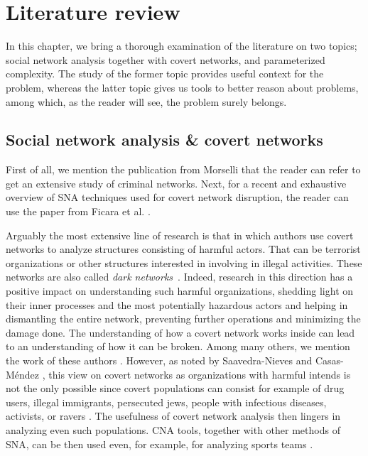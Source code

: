 \chapter{Literature review}

In this chapter, we bring a thorough examination of the literature on two topics;
social network analysis together with covert networks, and parameterized complexity.
The study of the former topic provides useful context for the \HL problem, whereas
the latter topic gives us tools to better reason about \NPh problems, among which, as the reader will see, the \HL problem surely belongs.

\section{Social network analysis \& covert networks}

First of all, we mention the publication from Morselli \cite{Morselli2009} that the reader can refer to get
an extensive study of criminal networks.
Next, for a recent and exhaustive overview of SNA techniques used for covert network disruption,
the reader can use the paper from Ficara et al. \cite{Ficara2022}.

Arguably the most extensive line of research is that in which authors use covert networks to analyze structures consisting of
harmful actors.
That can be terrorist organizations or other structures interested in involving in illegal activities. These networks are
also called \emph{dark networks}~\cite{Raab2003}.
Indeed, research in this direction has a positive impact on understanding such harmful organizations,
shedding light on their inner processes and the most potentially hazardous actors and helping in dismantling the entire network,
preventing further operations and minimizing the damage done.
The understanding of how a covert network works inside can lead to an understanding of how it can be broken.
Among many others, we mention the work of these authors \cite{Waniek2017,Dey2019,Raab2003,Lindelauf2009,Xu2005,Ressler2006, SaavedraNieves2023}.
However, as noted by Saavedra-Nieves and Casas-Méndez \cite{SaavedraNieves2023}, this view on covert networks as organizations with harmful
intends is not the only possible since covert populations can consist for example of drug users, illegal immigrants, persecuted jews,
people with infectious diseases, activists, or ravers \cite{Oliver2014}.
The usefulness of covert network analysis then lingers in analyzing even such populations.
CNA tools, together with other methods of SNA, can be then used even, for example, for analyzing sports teams \cite{Buldú2019}.

